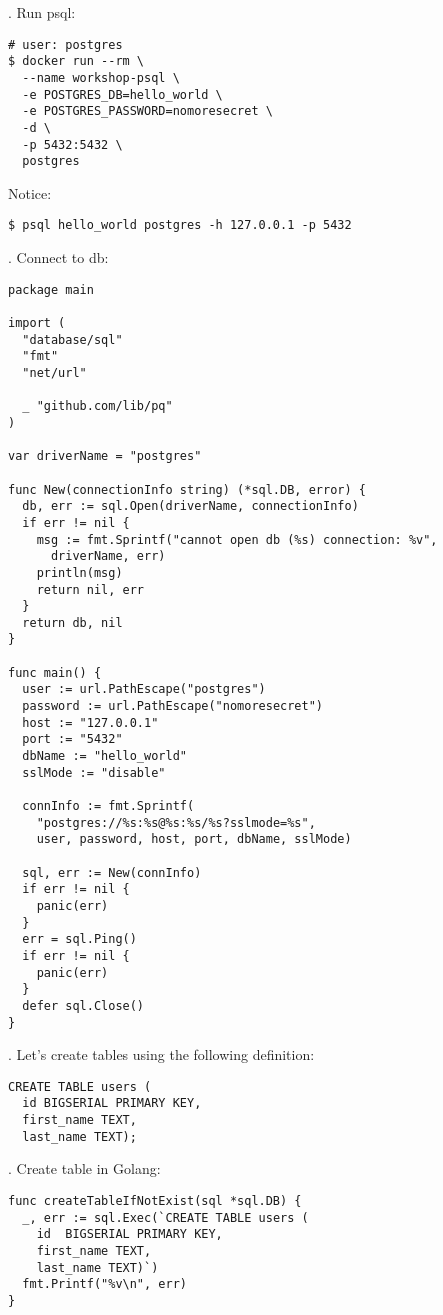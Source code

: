 \documentclass[11pt, letterpaper]{article}
\begin{document}
. Run psql:

\begin{verbatim}
# user: postgres
$ docker run --rm \
  --name workshop-psql \
  -e POSTGRES_DB=hello_world \
  -e POSTGRES_PASSWORD=nomoresecret \
  -d \
  -p 5432:5432 \
  postgres
\end{verbatim}

Notice:

\begin{verbatim}
$ psql hello_world postgres -h 127.0.0.1 -p 5432
\end{verbatim}

\bigskip
3. Connect to db:

\begin{verbatim}
package main

import (
  "database/sql"
  "fmt"
  "net/url"

  _ "github.com/lib/pq"
)

var driverName = "postgres"

func New(connectionInfo string) (*sql.DB, error) {
  db, err := sql.Open(driverName, connectionInfo)
  if err != nil {
    msg := fmt.Sprintf("cannot open db (%s) connection: %v", 
      driverName, err)
    println(msg)
    return nil, err
  }
  return db, nil
}

func main() {
  user := url.PathEscape("postgres")
  password := url.PathEscape("nomoresecret")
  host := "127.0.0.1"
  port := "5432"
  dbName := "hello_world"
  sslMode := "disable"

  connInfo := fmt.Sprintf(
    "postgres://%s:%s@%s:%s/%s?sslmode=%s",
    user, password, host, port, dbName, sslMode)

  sql, err := New(connInfo)
  if err != nil {
    panic(err)
  }
  err = sql.Ping()
  if err != nil {
    panic(err)
  }
  defer sql.Close()
}
\end{verbatim}

. Let's create tables using the following definition:

\begin{verbatim}
CREATE TABLE users (
  id BIGSERIAL PRIMARY KEY,
  first_name TEXT,
  last_name TEXT);
\end{verbatim}

\bigskip
5. Create table in Golang:

\begin{verbatim}
func createTableIfNotExist(sql *sql.DB) {
  _, err := sql.Exec(`CREATE TABLE users (
    id  BIGSERIAL PRIMARY KEY,
    first_name TEXT,
    last_name TEXT)`)
  fmt.Printf("%v\n", err)
}
\end{verbatim}
\end{document}
